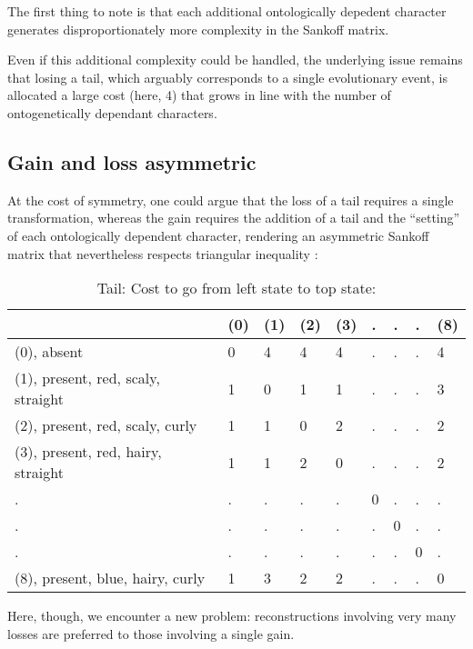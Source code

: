 \documentclass[]{book}
\theoremstyle{definition}
\theoremstyle{definition}
\theoremstyle{definition}
\theoremstyle{remark}
\begin{document}
The first thing to note is that each additional ontologically depedent
character generates disproportionately more complexity in the Sankoff
matrix.

Even if this additional complexity could be handled, the underlying
issue remains that losing a tail, which arguably corresponds to a single
evolutionary event, is allocated a large cost (here, 4) that grows in
line with the number of ontogenetically dependant characters.

\hypertarget{gain-and-loss-asymmetric}{%
\subsection{Gain and loss asymmetric}\label{gain-and-loss-asymmetric}}

At the cost of symmetry, one could argue that the loss of a tail
requires a single transformation, whereas the gain requires the addition
of a tail and the ``setting'' of each ontologically dependent character,
rendering an asymmetric Sankoff matrix that nevertheless respects
triangular inequality \citep{Wheeler1993}:

\begin{table}

\caption{\label{tab:unnamed-chunk-21}Tail: Cost to go from left state to top state:}
\centering
\begin{tabular}[t]{l|l|l|l|l|l|l|l|l}
\hline
  & (0) & (1) & (2) & (3) & . & . & . & (8)\\
\hline
(0), absent & 0 & 4 & 4 & 4 & . & . & . & 4\\
\hline
(1), present, red, scaly, straight & 1 & 0 & 1 & 1 & . & . & . & 3\\
\hline
(2), present, red, scaly, curly & 1 & 1 & 0 & 2 & . & . & . & 2\\
\hline
(3), present, red, hairy, straight & 1 & 1 & 2 & 0 & . & . & . & 2\\
\hline
. & . & . & . & . & 0 & . & . & .\\
\hline
. & . & . & . & . & . & 0 & . & .\\
\hline
. & . & . & . & . & . & . & 0 & .\\
\hline
(8), present, blue, hairy, curly & 1 & 3 & 2 & 2 & . & . & . & 0\\
\hline
\end{tabular}
\end{table}

Here, though, we encounter a new problem: reconstructions involving very
many losses are preferred to those involving a single gain.
\end{document}
